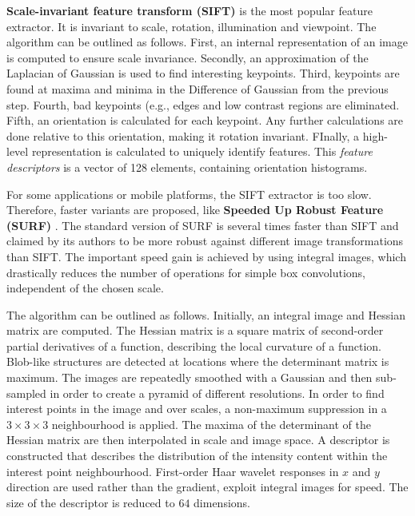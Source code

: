 \textbf{Scale-invariant feature transform (SIFT)} \cite{lowe1999object} is the most popular feature extractor.
It is invariant to scale, rotation, illumination and viewpoint.
The algorithm can be outlined as follows.
First, an internal representation of an image is computed to ensure scale invariance.
Secondly, an approximation of the Laplacian of Gaussian is used to find interesting keypoints.
Third, keypoints are found at maxima and minima in the Difference of Gaussian from the previous step.
Fourth, bad keypoints (e.g., edges and low contrast regions are eliminated.
Fifth, an orientation is calculated for each keypoint.
Any further calculations are done relative to this orientation, making it rotation invariant.
FInally, a high-level representation is calculated to uniquely identify features.
This \textit{feature descriptors} is a vector of 128 elements, containing orientation histograms.

For some applications or mobile platforms, the SIFT extractor is too slow.
Therefore, faster variants are proposed, like \textbf{Speeded Up Robust Feature (SURF)} \cite{Bay2008cviu}.
The standard version of SURF is several times faster than SIFT and claimed by its authors to be more robust against different image transformations than SIFT.
The important speed gain is achieved by using integral images, which drastically reduces the number of operations for simple box convolutions, independent of the chosen scale.

The algorithm can be outlined as follows.
Initially, an integral image and Hessian matrix \cite{van1994complex} are computed.
The Hessian matrix is a square matrix of second-order partial derivatives of a function, describing the local curvature of a function.
Blob-like structures are detected at locations where the determinant matrix is maximum.
The images are repeatedly smoothed with a Gaussian and then sub-sampled in order to create a pyramid of different resolutions.
In order to find interest points in the image and over scales, a non-maximum suppression in a $3 \times 3 \times 3$ neighbourhood is applied. 
The maxima of the determinant of the Hessian matrix are then interpolated in scale and image space.
A descriptor is constructed that describes the distribution of the intensity content within the interest point neighbourhood.
First-order Haar wavelet \cite{stollnitz1995wavelets} responses in $x$ and $y$ direction are used rather than the gradient, exploit integral images for speed. The size of the descriptor is reduced to $64$ dimensions.

